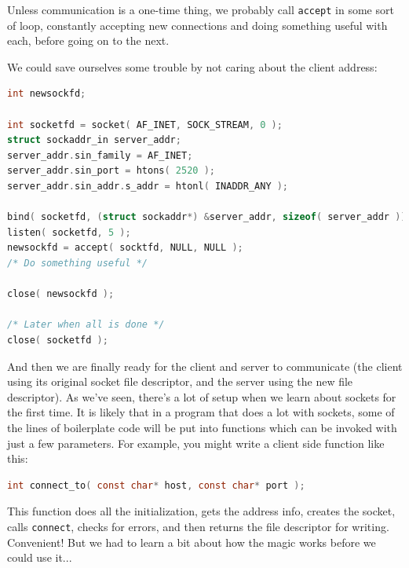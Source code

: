 Unless communication is a one-time thing, we probably call \texttt{accept} in some sort of loop, constantly accepting new connections and doing something useful with each, before going on to the next.

We could save ourselves some trouble by not caring about the client address:

\begin{lstlisting}[language=C]
int newsockfd;

int socketfd = socket( AF_INET, SOCK_STREAM, 0 );
struct sockaddr_in server_addr;
server_addr.sin_family = AF_INET;
server_addr.sin_port = htons( 2520 );
server_addr.sin_addr.s_addr = htonl( INADDR_ANY );

bind( socketfd, (struct sockaddr*) &server_addr, sizeof( server_addr ));
listen( socketfd, 5 );
newsockfd = accept( socktfd, NULL, NULL );
/* Do something useful */

close( newsockfd );

/* Later when all is done */
close( socketfd );
\end{lstlisting}

And then we are finally ready for the client and server to communicate (the client using its original socket file descriptor, and the server using the new file descriptor). As we've seen, there's a lot of setup when we learn about sockets for the first time. It is likely that in a program that does a lot with sockets, some of the lines of boilerplate code will be put into functions which can be invoked with just a few parameters. For example, you might write a client side function like this:

\begin{lstlisting}[language=C]
int connect_to( const char* host, const char* port ); 
\end{lstlisting}

This function does all the initialization, gets the address info, creates the socket, calls \texttt{connect}, checks for errors, and then returns the file descriptor for writing. Convenient! But we had to learn a bit about how the magic works before we could use it...



